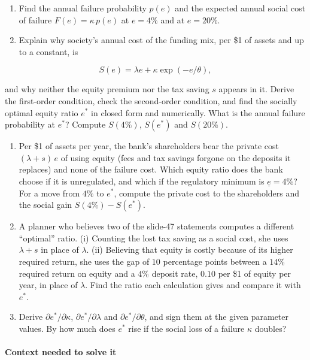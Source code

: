 \documentclass[11pt,a4paper]{article}
\numberwithin{equation}{section}
\begin{document}
\begin{enumerate}
\def\labelenumi{\alph{enumi}.}
\item
  Find the annual failure probability \(p(e)\) and the expected annual social cost of failure
  \(F(e) = \kappa\,p(e)\) at \(e = 4\%\) and at \(e = 20\%\).
\item
  Explain why society's annual cost of the funding mix, per \$1 of assets and up to a constant, is
\end{enumerate}

\[S(e) = \lambda e + \kappa \exp(-e/\theta),\]

and why neither the equity premium nor the tax saving \(s\) appears in it. Derive the first-order
condition, check the second-order condition, and find the socially optimal equity ratio \(e^*\) in
closed form and numerically. What is the annual failure probability at \(e^*\)? Compute \(S(4\%)\),
\(S(e^*)\) and \(S(20\%)\).

\begin{enumerate}
\def\labelenumi{\alph{enumi}.}
\setcounter{enumi}{2}
\item
  Per \$1 of assets per year, the bank's shareholders bear the private cost \((\lambda + s)\,e\) of
  using equity (fees and tax savings forgone on the deposits it replaces) and none of the failure
  cost. Which equity ratio does the bank choose if it is unregulated, and which if the regulatory
  minimum is \(\underline e = 4\%\)? For a move from \(4\%\) to \(e^*\), compute the private cost to
  the shareholders and the social gain \(S(4\%) - S(e^*)\).
\item
  A planner who believes two of the slide-47 statements computes a different ``optimal'' ratio. (i)
  Counting the lost tax saving as a social cost, she uses \(\lambda + s\) in place of \(\lambda\).
  (ii) Believing that equity is costly because of its higher required return, she uses the gap of
  \(10\) percentage points between a \(14\%\) required return on equity and a \(4\%\) deposit rate,
  \(0.10\) per \$1 of equity per year, in place of \(\lambda\). Find the ratio each calculation
  gives and compare it with \(e^*\).
\item
  Derive \(\partial e^*/\partial\kappa\), \(\partial e^*/\partial\lambda\) and
  \(\partial e^*/\partial\theta\), and sign them at the given parameter values. By how much does
  \(e^*\) rise if the social loss of a failure \(\kappa\) doubles?
\end{enumerate}

\paragraph{Context needed to solve it}
\end{document}
